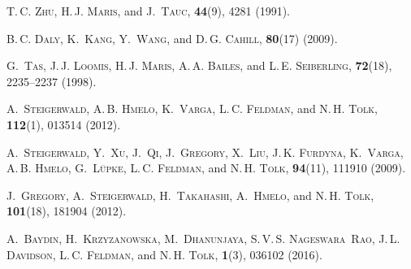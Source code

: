 \documentclass[pss]{wiley2sp} %
\begin{document}
\begin{thebibliography}{[10]}
 \textsc{T.\,C. Zhu},  \textsc{H.\,J. Maris},  and  \textsc{J.~Tauc},
  \textbf{44}(9), 4281 (1991).


 \textsc{B.\,C. Daly},  \textsc{K.~Kang},  \textsc{Y.~Wang},  and
  \textsc{D.\,G. Cahill},
  \textbf{80}(17) (2009).


 \textsc{G.~Tas},  \textsc{J.\,J. Loomis},  \textsc{H.\,J. Maris},
  \textsc{A.\,A. Bailes},  and  \textsc{L.\,E. Seiberling},
  \textbf{72}(18), 2235--2237 (1998).


 \textsc{A.~Steigerwald},  \textsc{A.\,B. Hmelo},  \textsc{K.~Varga},
  \textsc{L.\,C. Feldman},  and  \textsc{N.\,H. Tolk},
  \textbf{112}(1), 013514 (2012).


 \textsc{A.~Steigerwald},  \textsc{Y.~Xu},  \textsc{J.~Qi},
  \textsc{J.~Gregory},  \textsc{X.~Liu},  \textsc{J.\,K. Furdyna},
  \textsc{K.~Varga},  \textsc{A.\,B. Hmelo},  \textsc{G.~L{\"u}pke},
  \textsc{L.\,C. Feldman},  and  \textsc{N.\,H. Tolk},
  \textbf{94}(11), 111910 (2009).


 \textsc{J.~Gregory},  \textsc{A.~Steigerwald},  \textsc{H.~Takahashi},
  \textsc{A.~Hmelo},  and  \textsc{N.\,H. Tolk},
  \textbf{101}(18), 181904 (2012).


 \textsc{A.~Baydin},  \textsc{H.~Krzyzanowska},  \textsc{M.~Dhanunjaya},
  \textsc{S.\,V.\,S. Nageswara~Rao},  \textsc{J.\,L. Davidson},  \textsc{L.\,C.
  Feldman},  and  \textsc{N.\,H. Tolk},
  \textbf{1}(3), 036102 (2016).



\end{thebibliography}
\end{document}
